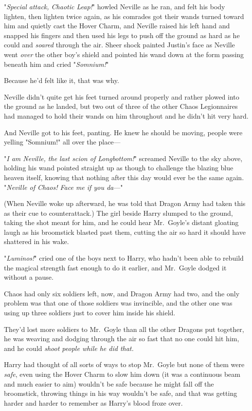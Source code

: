 "\emph{Special attack, Chaotic Leap!}" howled Neville as he ran, and felt his
body lighten, then lighten twice again, as his comrades got their wands turned
toward him and quietly cast the Hover Charm, and Neville raised his left hand
and snapped his fingers and then used his legs to push off the ground as hard
as he could and \emph{soared} through the air. Sheer shock painted Justin's
face as Neville went \emph{over} the other boy's shield and pointed his wand
down at the form passing beneath him and cried "\emph{Somnium!}"

Because he'd felt like it, that was why.

Neville didn't quite get his feet turned around properly and rather plowed into
the ground as he landed, but two out of three of the other Chaos Legionnaires
had managed to hold their wands on him throughout and he didn't hit very hard.

And Neville got to his feet, panting. He knew he should be moving, people were
yelling "Somnium!" all over the place\mbox{---}

"\emph{I am Neville, the last scion of Longbottom!}" screamed Neville to the
sky above, holding his wand pointed straight up as though to challenge the
blazing blue heaven itself, knowing that nothing after this day would ever be
the same again. "\emph{Neville of Chaos! Face me if you da}\mbox{---}"

(When Neville woke up afterward, he was told that Dragon Army had taken this as
their cue to counterattack.)
\sbreak
The girl beside Harry slumped to the ground, taking the shot meant for him, and
he could hear Mr.~Goyle's distant gloating laugh as his broomstick blasted past
them, cutting the air so hard it should have shattered in his wake.

"\emph{Luminos!}" cried one of the boys next to Harry, who hadn't been able to
rebuild the magical strength fast enough to do it earlier, and Mr.~Goyle dodged
it without a pause.

Chaos had only six soldiers left, now, and Dragon Army had two, and the only
problem was that one of those soldiers was invincible, and the other one was
using up three soldiers just to cover him inside his shield.

They'd lost more soldiers to Mr.~Goyle than all the other Dragons put together,
he was weaving and dodging through the air so fast that no one could hit him,
and he could \emph{shoot people while he did that.}

Harry had thought of all sorts of ways to stop Mr.~Goyle but none of them were
\emph{safe}, even using the Hover Charm to slow him down (it was a continuous
beam and much easier to aim) wouldn't be safe because he might fall off the
broomstick, throwing things in his way wouldn't be safe, and that was getting
harder and harder to remember as Harry's blood froze over.

